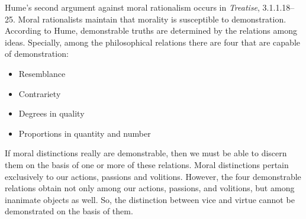 
Hume's second argument against moral rationalism occurs in \emph{Treatise}, 3.1.1.18--25. Moral rationalists maintain that morality is susceptible to demonstration. According to Hume, demonstrable truths are determined by the relations among ideas. Specially, among the philosophical relations there are four that are capable of demonstration:

\begin{itemize}
	\item Resemblance
	\item Contrariety
	\item Degrees in quality
	\item Proportions in quantity and number
\end{itemize}

If moral distinctions really are demonstrable, then we must be able to discern them on the basis of one or more of these relations. Moral distinctions pertain exclusively to our actions, passions and volitions. However, the four demonstrable relations obtain not only among our actions, passions, and volitions, but among inanimate objects as well. So, the distinction between vice and virtue cannot be demonstrated on the basis of them.

